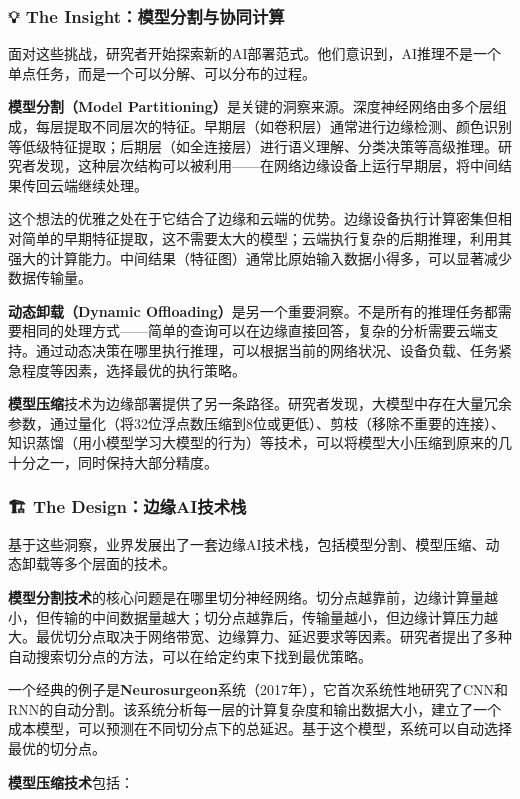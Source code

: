 \subsubsection{💡 The Insight：模型分割与协同计算}

面对这些挑战，研究者开始探索新的AI部署范式。他们意识到，AI推理不是一个单点任务，而是一个可以分解、可以分布的过程。

\textbf{模型分割（Model Partitioning）}是关键的洞察来源。深度神经网络由多个层组成，每层提取不同层次的特征。早期层（如卷积层）通常进行边缘检测、颜色识别等低级特征提取；后期层（如全连接层）进行语义理解、分类决策等高级推理。研究者发现，这种层次结构可以被利用——在网络边缘设备上运行早期层，将中间结果传回云端继续处理。

这个想法的优雅之处在于它结合了边缘和云端的优势。边缘设备执行计算密集但相对简单的早期特征提取，这不需要太大的模型；云端执行复杂的后期推理，利用其强大的计算能力。中间结果（特征图）通常比原始输入数据小得多，可以显著减少数据传输量。

\textbf{动态卸载（Dynamic Offloading）}是另一个重要洞察。不是所有的推理任务都需要相同的处理方式——简单的查询可以在边缘直接回答，复杂的分析需要云端支持。通过动态决策在哪里执行推理，可以根据当前的网络状况、设备负载、任务紧急程度等因素，选择最优的执行策略。

\textbf{模型压缩}技术为边缘部署提供了另一条路径。研究者发现，大模型中存在大量冗余参数，通过量化（将32位浮点数压缩到8位或更低）、剪枝（移除不重要的连接）、知识蒸馏（用小模型学习大模型的行为）等技术，可以将模型大小压缩到原来的几十分之一，同时保持大部分精度。

\subsubsection{🏗️ The Design：边缘AI技术栈}

基于这些洞察，业界发展出了一套边缘AI技术栈，包括模型分割、模型压缩、动态卸载等多个层面的技术。

\textbf{模型分割技术}的核心问题是在哪里切分神经网络。切分点越靠前，边缘计算量越小，但传输的中间数据量越大；切分点越靠后，传输量越小，但边缘计算压力越大。最优切分点取决于网络带宽、边缘算力、延迟要求等因素。研究者提出了多种自动搜索切分点的方法，可以在给定约束下找到最优策略。

一个经典的例子是\textbf{Neurosurgeon}系统（2017年），它首次系统性地研究了CNN和RNN的自动分割。该系统分析每一层的计算复杂度和输出数据大小，建立了一个成本模型，可以预测在不同切分点下的总延迟。基于这个模型，系统可以自动选择最优的切分点。

\textbf{模型压缩技术}包括：


